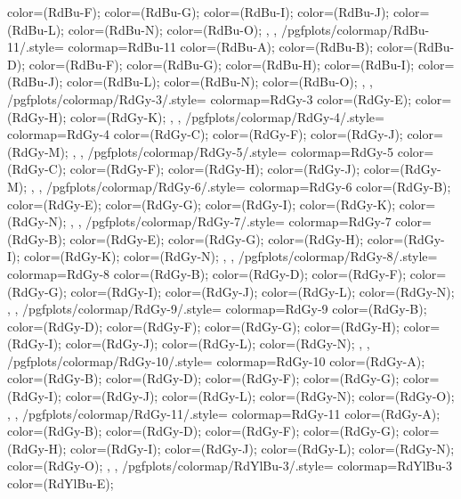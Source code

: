 {{{      color=(RdBu-F);
      color=(RdBu-G);
      color=(RdBu-I);
      color=(RdBu-J);
      color=(RdBu-L);
      color=(RdBu-N);
      color=(RdBu-O);
    },
  },
  /pgfplots/colormap/RdBu-11/.style={
    colormap={RdBu-11}{
      color=(RdBu-A);
      color=(RdBu-B);
      color=(RdBu-D);
      color=(RdBu-F);
      color=(RdBu-G);
      color=(RdBu-H);
      color=(RdBu-I);
      color=(RdBu-J);
      color=(RdBu-L);
      color=(RdBu-N);
      color=(RdBu-O);
    },
  },
  /pgfplots/colormap/RdGy-3/.style={
    colormap={RdGy-3}{
      color=(RdGy-E);
      color=(RdGy-H);
      color=(RdGy-K);
    },
  },
  /pgfplots/colormap/RdGy-4/.style={
    colormap={RdGy-4}{
      color=(RdGy-C);
      color=(RdGy-F);
      color=(RdGy-J);
      color=(RdGy-M);
    },
  },
  /pgfplots/colormap/RdGy-5/.style={
    colormap={RdGy-5}{
      color=(RdGy-C);
      color=(RdGy-F);
      color=(RdGy-H);
      color=(RdGy-J);
      color=(RdGy-M);
    },
  },
  /pgfplots/colormap/RdGy-6/.style={
    colormap={RdGy-6}{
      color=(RdGy-B);
      color=(RdGy-E);
      color=(RdGy-G);
      color=(RdGy-I);
      color=(RdGy-K);
      color=(RdGy-N);
    },
  },
  /pgfplots/colormap/RdGy-7/.style={
    colormap={RdGy-7}{
      color=(RdGy-B);
      color=(RdGy-E);
      color=(RdGy-G);
      color=(RdGy-H);
      color=(RdGy-I);
      color=(RdGy-K);
      color=(RdGy-N);
    },
  },
  /pgfplots/colormap/RdGy-8/.style={
    colormap={RdGy-8}{
      color=(RdGy-B);
      color=(RdGy-D);
      color=(RdGy-F);
      color=(RdGy-G);
      color=(RdGy-I);
      color=(RdGy-J);
      color=(RdGy-L);
      color=(RdGy-N);
    },
  },
  /pgfplots/colormap/RdGy-9/.style={
    colormap={RdGy-9}{
      color=(RdGy-B);
      color=(RdGy-D);
      color=(RdGy-F);
      color=(RdGy-G);
      color=(RdGy-H);
      color=(RdGy-I);
      color=(RdGy-J);
      color=(RdGy-L);
      color=(RdGy-N);
    },
  },
  /pgfplots/colormap/RdGy-10/.style={
    colormap={RdGy-10}{
      color=(RdGy-A);
      color=(RdGy-B);
      color=(RdGy-D);
      color=(RdGy-F);
      color=(RdGy-G);
      color=(RdGy-I);
      color=(RdGy-J);
      color=(RdGy-L);
      color=(RdGy-N);
      color=(RdGy-O);
    },
  },
  /pgfplots/colormap/RdGy-11/.style={
    colormap={RdGy-11}{
      color=(RdGy-A);
      color=(RdGy-B);
      color=(RdGy-D);
      color=(RdGy-F);
      color=(RdGy-G);
      color=(RdGy-H);
      color=(RdGy-I);
      color=(RdGy-J);
      color=(RdGy-L);
      color=(RdGy-N);
      color=(RdGy-O);
    },
  },
  /pgfplots/colormap/RdYlBu-3/.style={
    colormap={RdYlBu-3}{
      color=(RdYlBu-E);
}}}
